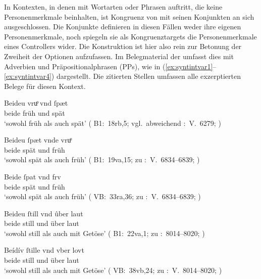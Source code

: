 In Kontexten, in denen  mit Wortarten oder Phrasen
auftritt, die keine Personenmerkmale beinhalten, ist Kongruenz von
 mit seinen Konjunkten an sich ausgeschlossen. Die Konjunkte
definieren in diesen Fällen weder ihre eigenen Personen\-merkmale, noch
spiegeln sie als Kongruenztargets die Personenmerkmale eines Controllers wider.
Die Konstruktion ist hier also rein zur Betonung der Zweiheit der Optionen
aufzufassen. Im Belegmaterial der \KC{} umfasst dies  mit Adverbien und Präpositionalphrasen (PPs), wie in
(\ref{ex:syntintvar1}--\ref{ex:syntintvar4}) dargestellt. Die zitierten Stellen
umfassen alle exzerptierten Belege für diesen Kontext.

\begin{exe}
\ex \label{ex:syntintvar1}
	\begin{xlist}
	\ex \gll Beideu vruͦ vnd ſpæt \\
		beide früh und spät \\
		\trans `sowohl früh als auch spät'
		(%
			B1:~18rb,5; vgl.~abweichend
			\KC:~V.~6279;
			\cite[196]{schroeder1895}%
		)

	\ex \gll Beideu ſpæt vnde vruͦ \\
		beide spät und früh \\
		\trans `sowohl spät als auch früh'
		(%
			B1:~19va,15; zu
			\KC:~V.~6834--6839;
			\cite[206]{schroeder1895}%
		)

	\ex \label{ex:syntintvar1_3}
	\gll Beide ſpat vnd frv \\
		beide spät und früh \\
		\trans `sowohl spät als auch früh'
			(%
				VB:~33ra,36; zu
				\KC:~V.~6834--6839;
				\cite[206]{schroeder1895}%
			)
\end{xlist}

\ex \label{ex:syntintvar3}
	\begin{xlist}
	\ex \gll Beideu ſtill vnd ûber laut \\
		beide still und über laut \\
		\trans `sowohl still als auch mit Getöse'
			(%
				B1:~22va,1; zu
				\KC:~8014--8020;
				\cite[228]{schroeder1895}%
			)

	\ex \label{ex:syntintvar3_2}
		\gll Beídív ſtille vnd vber lovt \\
		beide still und über laut \\
		\trans `sowohl still als auch mit Getöse'
			(%
				VB:~38vb,24; zu
				\KC:~V.~8014--8020;
				\cite[228]{schroeder1895}%
			)
\end{xlist}
\end{exe}

